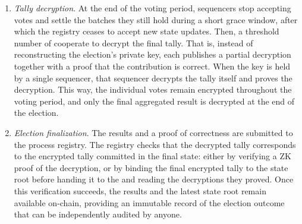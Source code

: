 \begin{enumerate}
	\item \textit{Tally decryption}.
	At the end of the voting period, sequencers stop accepting votes and settle the batches they still hold during a short grace window, after which the registry ceases to accept new state updates.
	Then, a threshold number of \keywardens cooperate to decrypt the final tally.
	That is, instead of reconstructing the election's private key, each \keywarden publishes a partial decryption together with a proof that the contribution is correct. When the key is held by a single sequencer, that sequencer decrypts the tally itself and proves the decryption.
	This way, the individual votes remain encrypted throughout the voting period, and only the final aggregated result is decrypted at the end of the election.
	\\
	\item \textit{Election finalization}.
	The results and a proof of correctness are submitted to the process registry. The registry checks that the decrypted tally corresponds to the encrypted tally committed in the final state: either by verifying a \ac{ZK} proof of the decryption, or by binding the final encrypted tally to the state root before handing it to the \keywardens and reading the decryptions they proved. Once this verification succeeds, the results and the latest state root remain available on-chain, providing an immutable record of the election outcome that can be independently audited by anyone.
\end{enumerate}
